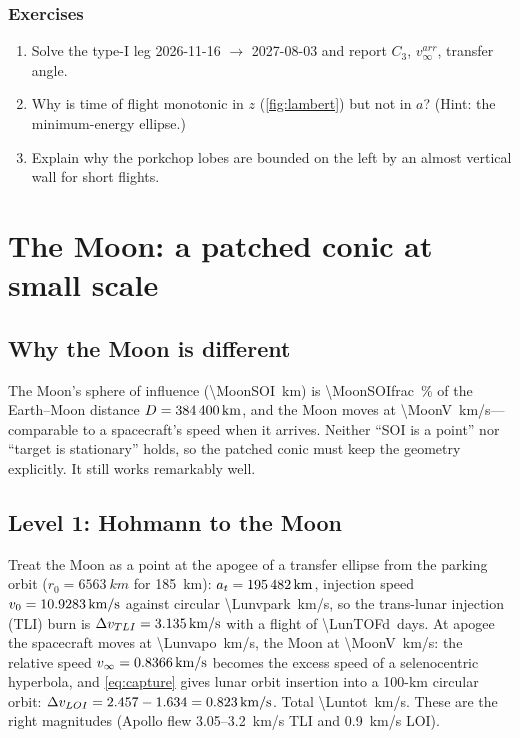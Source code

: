 \documentclass[11pt,letterpaper,oneside]{report}
\newcommand{\dv}{\Delta v}
\newcommand{\vinf}{v_\infty}
\begin{document}
\subsection*{Exercises}
\begin{enumerate}[label=5.\arabic*,nosep]
\item Solve the type-I leg 2026-11-16 $\to$ 2027-08-03 and report $C_3$, $\vinf^{arr}$, transfer angle.
\item Why is time of flight monotonic in $z$ (\cref{fig:lambert}) but not in $a$? (Hint: the minimum-energy ellipse.)
\item Explain why the porkchop lobes are bounded on the left by an almost vertical wall for short flights.
\end{enumerate}

\chapter{The Moon: a patched conic at small scale}\label{ch:moon}

\section{Why the Moon is different}
The Moon's sphere of influence (\SI{\MoonSOI}{km}) is \SI{\MoonSOIfrac}{\percent} of the Earth--Moon
distance $D=\SI{384400}{km}$, and the Moon moves at \SI{\MoonV}{km/s}---comparable to a
spacecraft's speed when it arrives. Neither ``SOI is a point'' nor ``target is stationary''
holds, so the patched conic must keep the geometry explicitly. It still works remarkably well.

\section{Level 1: Hohmann to the Moon}
Treat the Moon as a point at the apogee of a transfer ellipse from the parking orbit
($r_0=\SI{6563}{km}$ for 185~km): $a_t=\SI{195482}{km}$, injection speed $v_0=\SI{10.9283}{km/s}$
against circular \SI{\Lunvpark}{km/s}, so the trans-lunar injection (TLI) burn is
$\dv_{TLI}=\SI{\LunTLIdv}{km/s}$ with a flight of \SI{\LunTOFd}{days}. At apogee the spacecraft
moves at \SI{\Lunvapo}{km/s}, the Moon at \SI{\MoonV}{km/s}: the relative speed
$\vinf=\SI{\Lunvinf}{km/s}$ becomes the excess speed of a selenocentric hyperbola, and
\cref{eq:capture} gives lunar orbit insertion into a 100-km circular orbit:
$\dv_{LOI}=\SI{\LunLOIvhyp}{}-\SI{\LunLOIvc}{}=\SI{\LunLOI}{km/s}$. Total \SI{\Luntot}{km/s}.
These are the right magnitudes (Apollo flew \SI{3.05}{}--\SI{3.2}{km/s} TLI and \SI{0.9}{km/s} LOI).
\end{document}
